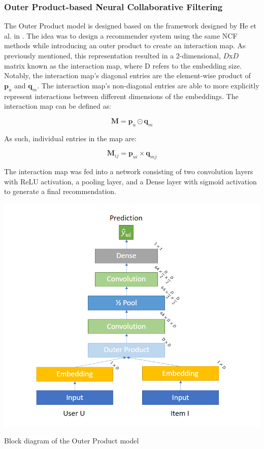 \documentclass{article}
\begin{document}
\subsubsection{Outer Product-based Neural Collaborative Filtering}
The Outer Product model is designed based on the framework designed by He et al. in \cite{he2018outer}. The idea was to design a recommender system using the same NCF methods while introducing an outer product to create an interaction map. As previously mentioned, this representation resulted in a 2-dimensional, $D$x$D$ matrix known as the interaction map, where D refers to the embedding size. Notably, the interaction map's diagonal entries are the element-wise product of $\mathbf{p}_{u}$ and $\mathbf{q}_{m}$. The interaction map's non-diagonal entries are able to more explicitly represent interactions between different dimensions of the embeddings. The interaction map can be defined as:

\[
\mathbf{M} = \mathbf{p}_{u} \odot \mathbf{q}_{m}
\]

As such, individual entries in the map are:

\[
\mathbf{M}_{ij} = \mathbf{p}_{ui}\times\mathbf{q}_{mj}
\]

The interaction map was fed into a network consisting of two convolution layers with ReLU activation, a pooling layer, and a Dense layer with sigmoid activation to generate a final recommendation. 

\begin{center}
\includegraphics[scale=0.4]{OuterProduct_Diagram}

Block diagram of the Outer Product model
\end{center}
\end{document}
